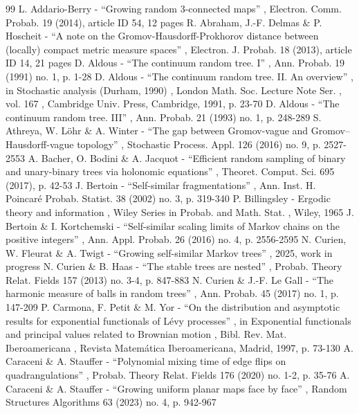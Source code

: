 \begin{thebibliography}{99}
 L. Addario-Berry - “Growing random 3-connected maps” , Electron. Comm. Probab. 19 (2014), article ID 54, 12 pages
 R. Abraham, J.-F. Delmas \& P. Hoscheit - “A note on the Gromov-Hausdorff-Prokhorov distance between (locally) compact metric measure spaces” , Electron. J. Probab. 18 (2013), article ID 14, 21 pages
 D. Aldous - “The continuum random tree. I” , Ann. Probab. 19 (1991) no. 1, p. 1-28
 D. Aldous - “The continuum random tree. II. An overview” , in Stochastic analysis (Durham, 1990) , London Math. Soc. Lecture Note Ser. , vol. 167 , Cambridge Univ. Press, Cambridge, 1991, p. 23-70
 D. Aldous - “The continuum random tree. III” , Ann. Probab. 21 (1993) no. 1, p. 248-289
 S. Athreya, W. Löhr \& A. Winter - “The gap between Gromov-vague and Gromov–Hausdorff-vague topology” , Stochastic Process. Appl. 126 (2016) no. 9, p. 2527-2553
 A. Bacher, O. Bodini \& A. Jacquot - “Efficient random sampling of binary and unary-binary trees via holonomic equations” , Theoret. Comput. Sci. 695 (2017), p. 42-53
 J. Bertoin - “Self-similar fragmentations” , Ann. Inst. H. Poincaré Probab. Statist. 38 (2002) no. 3, p. 319-340
 P. Billingsley - Ergodic theory and information , Wiley Series in Probab. and Math. Stat. , Wiley, 1965
 J. Bertoin \& I. Kortchemski - “Self-similar scaling limits of Markov chains on the positive integers” , Ann. Appl. Probab. 26 (2016) no. 4, p. 2556-2595
 N. Curien, W. Fleurat \& A. Twigt - “Growing self-similar Markov trees” , 2025, work in progress
 N. Curien \& B. Haas - “The stable trees are nested” , Probab. Theory Relat. Fields 157 (2013) no. 3-4, p. 847-883
 N. Curien \& J.-F. Le Gall - “The harmonic measure of balls in random trees” , Ann. Probab. 45 (2017) no. 1, p. 147-209
 P. Carmona, F. Petit \& M. Yor - “On the distribution and asymptotic results for exponential functionals of Lévy processes” , in Exponential functionals and principal values related to Brownian motion , Bibl. Rev. Mat. Iberoamericana , Revista Matemática Iberoamericana, Madrid, 1997, p. 73-130
 A. Caraceni \& A. Stauffer - “Polynomial mixing time of edge flips on quadrangulations” , Probab. Theory Relat. Fields 176 (2020) no. 1-2, p. 35-76
 A. Caraceni \& A. Stauffer - “Growing uniform planar maps face by face” , Random Structures Algorithms 63 (2023) no. 4, p. 942-967

\end{thebibliography}
